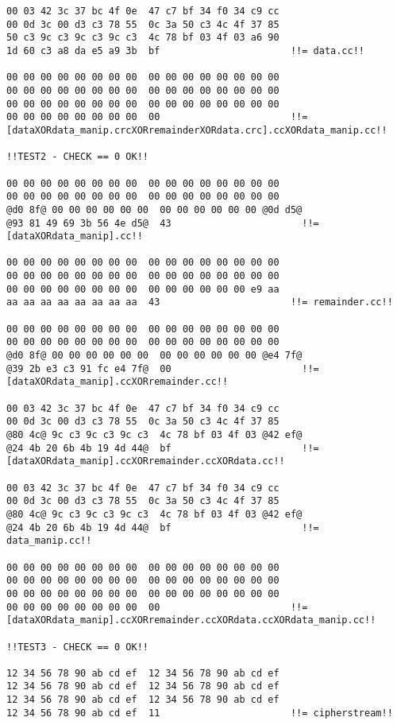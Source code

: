 \begin{lstlisting}[caption={Die Kommandozeilenausgabe von \texttt{setup\_manip\_test} aus osmoMITM}, boxpos=c, frame=single, language=bytetxt, numbers=none, basicstyle=\tiny\ttfamily, tabsize=1 ]
00 03 42 3c 37 bc 4f 0e  47 c7 bf 34 f0 34 c9 cc 
00 0d 3c 00 d3 c3 78 55  0c 3a 50 c3 4c 4f 37 85 
50 c3 9c c3 9c c3 9c c3  4c 78 bf 03 4f 03 a6 90
1d 60 c3 a8 da e5 a9 3b  bf                       !!= data.cc!!

00 00 00 00 00 00 00 00  00 00 00 00 00 00 00 00 
00 00 00 00 00 00 00 00  00 00 00 00 00 00 00 00 
00 00 00 00 00 00 00 00  00 00 00 00 00 00 00 00 
00 00 00 00 00 00 00 00  00                       !!= [dataXORdata_manip.crcXORremainderXORdata.crc].ccXORdata_manip.cc!!

!!TEST2 - CHECK == 0 OK!!

00 00 00 00 00 00 00 00  00 00 00 00 00 00 00 00 
00 00 00 00 00 00 00 00  00 00 00 00 00 00 00 00 
@d0 8f@ 00 00 00 00 00 00  00 00 00 00 00 00 @0d d5@ 
@93 81 49 69 3b 56 4e d5@  43                       !!= [dataXORdata_manip].cc!!

00 00 00 00 00 00 00 00  00 00 00 00 00 00 00 00 
00 00 00 00 00 00 00 00  00 00 00 00 00 00 00 00 
00 00 00 00 00 00 00 00  00 00 00 00 00 00 e9 aa 
aa aa aa aa aa aa aa aa  43                       !!= remainder.cc!!

00 00 00 00 00 00 00 00  00 00 00 00 00 00 00 00 
00 00 00 00 00 00 00 00  00 00 00 00 00 00 00 00 
@d0 8f@ 00 00 00 00 00 00  00 00 00 00 00 00 @e4 7f@ 
@39 2b e3 c3 91 fc e4 7f@  00                       !!= [dataXORdata_manip].ccXORremainder.cc!!

00 03 42 3c 37 bc 4f 0e  47 c7 bf 34 f0 34 c9 cc 
00 0d 3c 00 d3 c3 78 55  0c 3a 50 c3 4c 4f 37 85 
@80 4c@ 9c c3 9c c3 9c c3  4c 78 bf 03 4f 03 @42 ef@ 
@24 4b 20 6b 4b 19 4d 44@  bf                       !!= [dataXORdata_manip].ccXORremainder.ccXORdata.cc!!

00 03 42 3c 37 bc 4f 0e  47 c7 bf 34 f0 34 c9 cc 
00 0d 3c 00 d3 c3 78 55  0c 3a 50 c3 4c 4f 37 85 
@80 4c@ 9c c3 9c c3 9c c3  4c 78 bf 03 4f 03 @42 ef@ 
@24 4b 20 6b 4b 19 4d 44@  bf                       !!= data_manip.cc!!

00 00 00 00 00 00 00 00  00 00 00 00 00 00 00 00 
00 00 00 00 00 00 00 00  00 00 00 00 00 00 00 00 
00 00 00 00 00 00 00 00  00 00 00 00 00 00 00 00 
00 00 00 00 00 00 00 00  00                       !!= [dataXORdata_manip].ccXORremainder.ccXORdata.ccXORdata_manip.cc!!

!!TEST3 - CHECK == 0 OK!!

12 34 56 78 90 ab cd ef  12 34 56 78 90 ab cd ef 
12 34 56 78 90 ab cd ef  12 34 56 78 90 ab cd ef 
12 34 56 78 90 ab cd ef  12 34 56 78 90 ab cd ef 
12 34 56 78 90 ab cd ef  11                       !!= cipherstream!!


\end{lstlisting}
